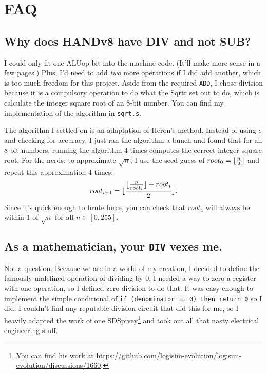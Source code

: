 \documentclass[12pt, oneside]{memoir}
\DeclarePairedDelimiter{\floor}{\lfloor}{\rfloor}
\newcommand{\instruction}[1]{{\color{instruction}\texttt{#1}}}
\begin{document}
\section{FAQ}
\subsection{Why does HANDv8 have DIV and not SUB?}
I could only fit one ALUop bit into the machine code. (It'll make more sense in a few pages.) Plus, I'd need to add \textit{two} more operations if I did add another, which is too much freedom for this project. Aside from the required \instruction{ADD}, I chose division because it is a compulsory operation to do what the Sqrtr set out to do, which is calculate the integer square root of an 8-bit number. You can find my implementation of the algorithm in \texttt{sqrt.s}.

The algorithm I settled on is an adaptation of Heron's method. Instead of using $\epsilon$ and checking for accuracy, I just ran the algorithm a bunch and found that for all 8-bit numbers, running the algorithm 4 times computes the correct integer square root. For the nerds: to approximate $\sqrt{n}$, I use the seed guess of $root_0 = \floor{\frac{n}{2}}$ and repeat this approximation 4 times:
\begin{equation*}
    root_{i+1} = \floor{\frac{\floor{\frac{n}{root_{i}}} + root_{i}}{2}}.
\end{equation*}
Since it's quick enough to brute force, you can check that $root_4$ will always be within 1 of $\sqrt{n}$ for all $n \in [0,255]$.

\subsection{As a mathematician, your \instruction{DIV} vexes me.}
Not a question. Because we are in a world of my creation, I decided to define the famously undefined operation of dividing by 0. I needed a way to zero a register with one operation, so I defined zero-division to do that. It was easy enough to implement the simple conditional of \texttt{if (denominator == 0) then return 0} so I did. I couldn't find any reputable division circuit that did this for me, so I heavily adapted the work of one SDSpivey\footnote{You can find his work at \href{https://github.com/logisim-evolution/logisim-evolution/discussions/1660}{https://github.com/logisim-evolution/logisim-evolution/discussions/1660}.} 
and took out all that nasty electrical engineering stuff.
\end{document}
